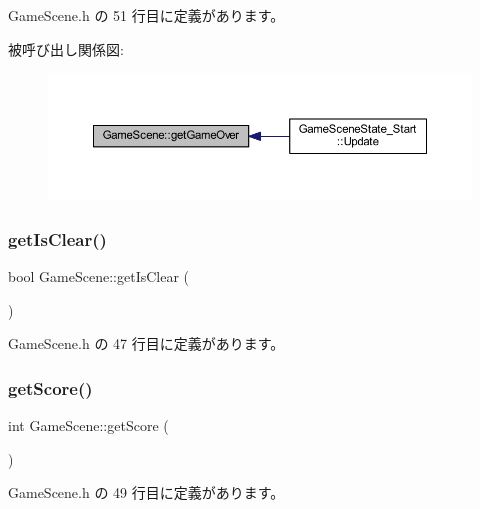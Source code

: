  Game\+Scene.\+h の 51 行目に定義があります。

被呼び出し関係図\+:\nopagebreak
\begin{figure}[H]
\begin{center}
\leavevmode
\includegraphics[width=350pt]{class_game_scene_a2f8413f473bc9a937fa02bfd4678d61d_icgraph}
\end{center}
\end{figure}
\mbox{\label{class_game_scene_a56604f01c0fa914660c3d8b788a94405}} 
\subsubsection{\texorpdfstring{get\+Is\+Clear()}{getIsClear()}}
{\footnotesize\ttfamily bool Game\+Scene\+::get\+Is\+Clear (\begin{DoxyParamCaption}{ }\end{DoxyParamCaption})\hspace{0.3cm}{\ttfamily [inline]}}



 Game\+Scene.\+h の 47 行目に定義があります。

\mbox{\label{class_game_scene_a16b26b3b8ea91dcaf762292414bf5d6d}} 
\subsubsection{\texorpdfstring{get\+Score()}{getScore()}}
{\footnotesize\ttfamily int Game\+Scene\+::get\+Score (\begin{DoxyParamCaption}{ }\end{DoxyParamCaption})\hspace{0.3cm}{\ttfamily [inline]}}



 Game\+Scene.\+h の 49 行目に定義があります。

